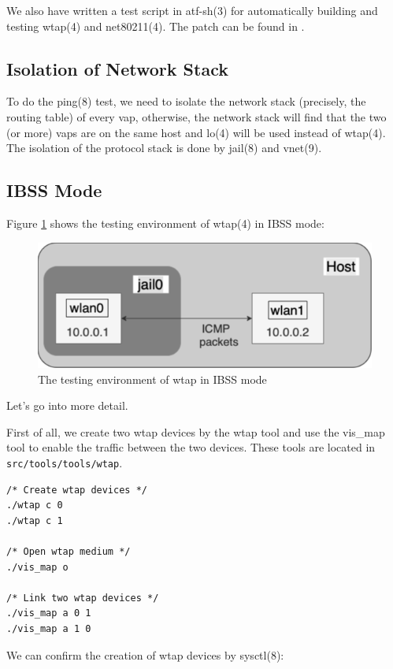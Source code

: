 \documentclass[conference]{IEEEtran}
\begin{document}
We also have written a test script in atf-sh(3) for automatically building and testing wtap(4) and net80211(4). The patch can be found in \cite{commit:atf}.

\subsection{Isolation of Network Stack}
To do the ping(8) test, we need to isolate the network stack (precisely, the routing table) of every vap, otherwise, the network stack will find that the two (or more) vaps are on the same host and lo(4) will be used instead of wtap(4). The isolation of the protocol stack is done by jail(8) and vnet(9).

\subsection{IBSS Mode}
Figure \ref{fig:ibss-test} shows the testing environment of wtap(4) in IBSS mode:

\begin{figure}[h]
\includegraphics[scale=0.4]{ping-ibss-experiment-modified.png}
\caption{The testing environment of wtap in IBSS mode}
\label{fig:ibss-test}
\end{figure}

Let’s go into more detail.

First of all, we create two wtap devices by the wtap tool and use the vis\_map tool to enable the traffic between the two devices. These tools are located in \lstinline{src/tools/tools/wtap}.

\begin{lstlisting}[caption=Create wtap devices, label={lst:wtap_tool}]
/* Create wtap devices */
./wtap c 0
./wtap c 1

/* Open wtap medium */
./vis_map o

/* Link two wtap devices */
./vis_map a 0 1
./vis_map a 1 0
\end{lstlisting}

We can confirm the creation of wtap devices by sysctl(8):
\end{document}
